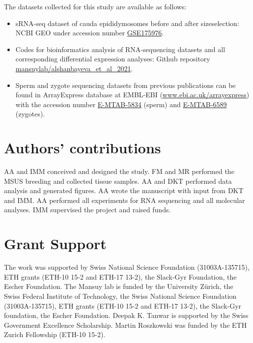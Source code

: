 \documentclass[12pt,twoside]{reedthesis}
\begin{document}
The datasets collected for this study are available as follows:
\begin{itemize}
\item
  sRNA-seq dataset of cauda epididymosomes before and after sizeselection: NCBI GEO under accession number \href{https://www.ncbi.nlm.nih.gov/geo/query/acc.cgi?acc=GSE175976}{GSE175976}.
\item
  Codes for bioinformatics analysis of RNA-sequencing datasets and
  all corresponding differential expression analyses: Github repository \href{https://github.com/mansuylab/alshanbayeva_et_al_2021}{mansuylab/alshanbayeva\_et\_al\_2021}.
\item
  Sperm and zygote sequencing datasets from previous publications
  can be found in ArrayExpress database at EMBL-EBI (\url{www.ebi.ac.uk/arrayexpress}) with the accession number \href{https://www.ebi.ac.uk/arrayexpress/experiments/E-MTAB-5834/}{E-MTAB-5834} (sperm) and \href{https://www.ebi.ac.uk/arrayexpress/experiments/E-MTAB-6589/}{E-MTAB-6589} (zygotes).
\end{itemize}
\newpage

\hypertarget{authors-contributions}{%
\section{Authors' contributions}\label{authors-contributions}}

AA and IMM conceived and designed the study. FM and MR performed the MSUS breeding and collected tissue samples. AA and DKT performed data analysis and generated figures. AA wrote the manuscript with input from DKT and IMM. AA performed all
experiments for RNA sequencing and all molecular analyses. IMM supervised the project and raised funds.

\hypertarget{grant-support}{%
\section{Grant Support}\label{grant-support}}

The work was supported by Swiss National Science Foundation (31003A-135715), ETH grants (ETH-10 15-2 and ETH-17 13-2), the Slack-Gyr Foundation, the Escher Foundation. The Mansuy lab is funded by the University Zürich, the Swiss Federal Institute of Technology, the Swiss National Science Foundation (31003A-135715), ETH grants (ETH-10 15-2 and ETH-17 13-2), the Slack-Gyr foundation, the Escher Foundation. Deepak K. Tanwar is supported by the Swiss Government Excellence Scholarship. Martin Roszkowski was funded by the ETH Zurich Fellowship (ETH-10 15-2).
\end{document}

